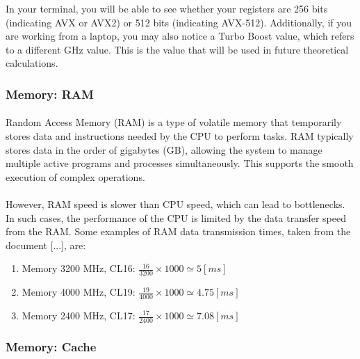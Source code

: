     In your terminal, you will be able to see whether your registers are 256 bits (indicating AVX or AVX2) or 512 bits 
    (indicating AVX-512). Additionally, if you are working from a laptop, you may also notice a Turbo Boost value, which 
    refers to a different GHz value. This is the value that will be used in future theoretical calculations.

    

    \subsubsection{Memory: RAM}

    \paragraph*{}
    Random Access Memory (RAM) is a type of volatile memory that temporarily stores data and instructions needed 
    by the CPU to perform tasks. RAM typically stores data in the order of gigabytes (GB), allowing the system 
    to manage multiple active programs and processes simultaneously. This supports the smooth execution of complex 
    operations.
    \par

    \paragraph*{}
    However, RAM speed is slower than CPU speed, which can lead to bottlenecks. In such cases, the performance of 
    the CPU is limited by the data transfer speed from the RAM. Some examples of RAM data transmission times, 
    taken from the document [...], are:
    \begin{enumerate}
        \item Memory 3200 MHz, CL16: $\frac{16}{3200} \times 1000 \simeq 5 [ms]$
        \item Memory 4000 MHz, CL19: $\frac{19}{4000} \times 1000 \simeq 4.75 [ms]$
        \item  Memory 2400 MHz, CL17: $\frac{17}{2400} \times 1000 \simeq 7.08 [ms]$
    \end{enumerate}
    
    
   
\subsubsection{Memory: Cache}


